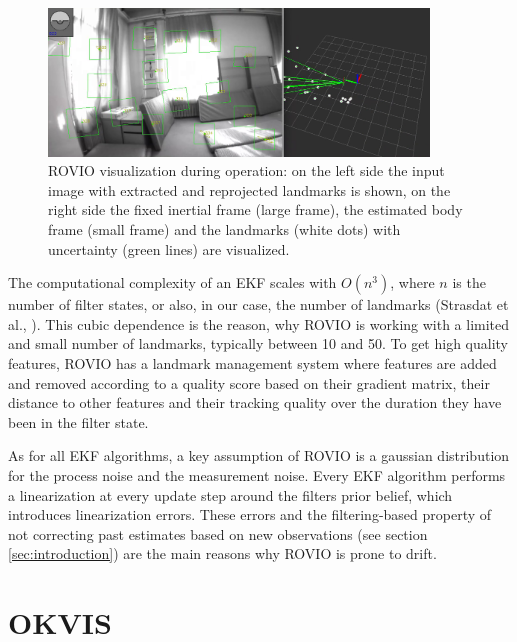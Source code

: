 \begin{figure}
   \centering
   \includegraphics[width=0.9\textwidth]{images/rovio_frontend.png}
   \caption{ROVIO visualization during operation: on the left side the input image with extracted and reprojected landmarks is shown, on the right side the fixed inertial frame (large frame), the estimated body frame (small frame) and the landmarks (white dots) with uncertainty (green lines) are visualized.}
   \label{pics:rovio_frontend}
\end{figure}

The computational complexity of an EKF scales with $O(n^3)$, where $n$ is the number of filter states, or also, in our case, the number of landmarks (Strasdat et al., \cite{strasdat2010real}). This cubic dependence is the reason, why ROVIO is working with a limited and small number of landmarks, typically between 10 and 50. To get high quality features, ROVIO has a landmark management system where features are added and removed according to a quality score based on their gradient matrix, their distance to other features and their tracking quality over the duration they have been in the filter state. 

As for all EKF algorithms, a key assumption of ROVIO is a gaussian distribution for the process noise and the measurement noise. Every EKF algorithm performs a linearization at every update step around the filters prior belief, which introduces linearization errors. These errors and the filtering-based property of not correcting past estimates based on new observations (see section \ref{sec:introduction}) are the main reasons why ROVIO is prone to drift.



\section{OKVIS}
\label{sec:okvis}

